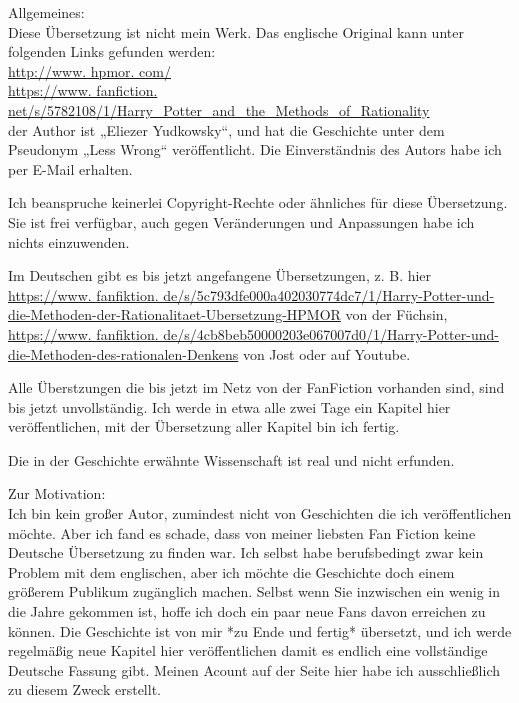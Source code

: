 

\hypertarget{einfuxfchrung}{%

Allgemeines:\\ Diese Übersetzung ist nicht mein Werk. Das englische Original kann unter folgenden Links gefunden werden:\\ \href{http://www.\%20hpmor.\%20com/“\%20target=}{http://www. hpmor. com/}\\ \href{https://www.\%20fanfiction.\%20net/s/5782108/1/Harry_Potter_and_the_Methods_of_Rationality“\%20target=}{https://www. fanfiction. net/s/5782108/1/Harry\_Potter\_and\_the\_Methods\_of\_Rationality}\\ der Author ist „Eliezer Yudkowsky“, und hat die Geschichte unter dem Pseudonym „Less Wrong“ veröffentlicht. Die Einverständnis des Autors habe ich per E-Mail erhalten.

Ich beanspruche keinerlei Copyright-Rechte oder ähnliches für diese Übersetzung. Sie ist frei verfügbar, auch gegen Veränderungen und Anpassungen habe ich nichts einzuwenden.

Im Deutschen gibt es bis jetzt angefangene Übersetzungen, z. B. hier\\ \href{https://www.\%20fanfiktion.\%20de/s/5c793dfe000a402030774dc7/1/Harry-Potter-und-die-Methoden-der-Rationalitaet-Ubersetzung-HPMOR“\%20target=}{https://www. fanfiktion. de/s/5c793dfe000a402030774dc7/1/Harry-Potter-und-die-Methoden-der-Rationalitaet-Ubersetzung-HPMOR} von der Füchsin,\\ \href{https://www.\%20fanfiktion.\%20de/s/4cb8beb50000203e067007d0/1/Harry-Potter-und-die-Methoden-des-rationalen-Denkens“\%20target=}{https://www. fanfiktion. de/s/4cb8beb50000203e067007d0/1/Harry-Potter-und-die-Methoden-des-rationalen-Denkens} von Jost oder auf Youtube.

Alle Überstzungen die bis jetzt im Netz von der FanFiction vorhanden sind, sind bis jetzt unvollständig. Ich werde in etwa alle zwei Tage ein Kapitel hier veröffentlichen, mit der Übersetzung aller Kapitel bin ich fertig.

Die in der Geschichte erwähnte Wissenschaft ist real und nicht erfunden.

Zur Motivation:\\ Ich bin kein großer Autor, zumindest nicht von Geschichten die ich veröffentlichen möchte. Aber ich fand es schade, dass von meiner liebsten Fan Fiction keine Deutsche Übersetzung zu finden war. Ich selbst habe berufsbedingt zwar kein Problem mit dem englischen, aber ich möchte die Geschichte doch einem größerem Publikum zugänglich machen. Selbst wenn Sie inzwischen ein wenig in die Jahre gekommen ist, hoffe ich doch ein paar neue Fans davon erreichen zu können. Die Geschichte ist von mir *zu Ende und fertig* übersetzt, und ich werde regelmäßig neue Kapitel hier veröffentlichen damit es endlich eine vollständige Deutsche Fassung gibt. Meinen Acount auf der Seite hier habe ich ausschließlich zu diesem Zweck erstellt.

}
